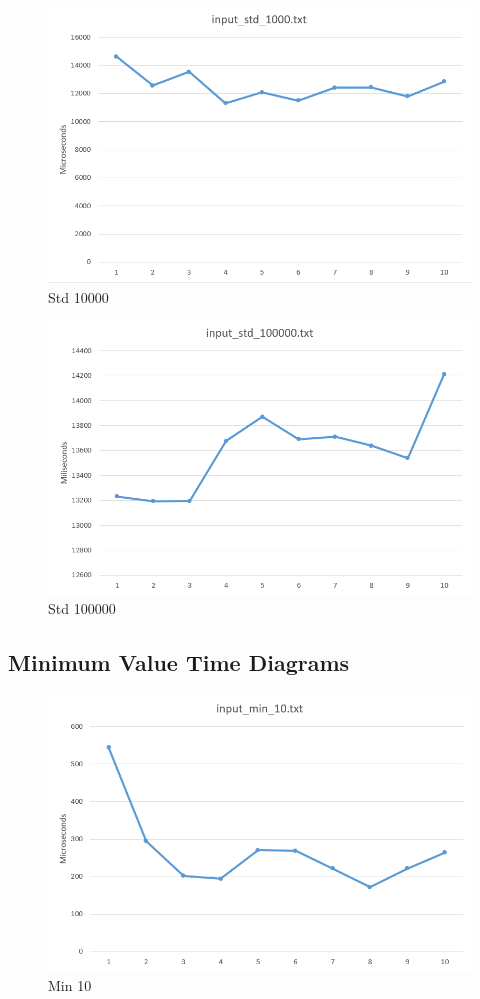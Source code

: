 \documentclass[a4paper, 12pt, titlepage]{article}
\begin{document}
\begin{figure}[H]
	\centering
	\caption{Std 10000}
	\includegraphics[width=.75\textwidth]{std1000.png} %
\end{figure}

\begin{figure}[H]
	\centering
	\caption{Std 100000}
	\includegraphics[width=.75\textwidth]{std100000.png} %
\end{figure}

\subsection{Minimum Value Time Diagrams}

\begin{figure}[H]
	\centering
	\caption{Min 10}
	\includegraphics[width=.75\textwidth]{min10.png} %
\end{figure}
\end{document}

